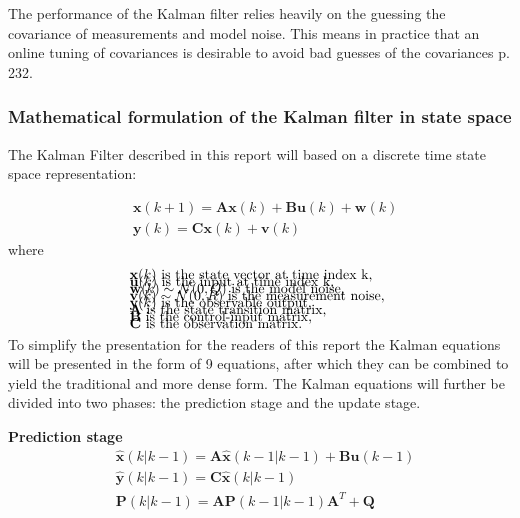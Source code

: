 The performance of the Kalman filter relies heavily on the guessing the covariance of measurements and model noise. This means in practice that an online tuning of covariances is desirable to avoid bad guesses of the covariances \cite{Doraiswami2014} p. 232.

\subsubsection{Mathematical formulation of the Kalman filter in state space}
The Kalman Filter described in this report will based on a discrete time state space representation: 

\begin{align}
	&\textbf{x}(k+1) = \textbf{A}\textbf{x}(k) + \textbf{B}\textbf{u}(k) + \textbf{w}(k)  \label{eq:KalmanSystemEquations} \\
	&\textbf{y}(k) = \textbf{C}\textbf{x}(k)+\textbf{v}(k) 
\end{align}
where 
\begin{align*}
	&\text{$\textbf{x}(k)$ is the state vector at time index k,					}	\\[-1em]
	&\text{$\textbf{u}(k)$ is the input at time index k, 						}	\\[-1em]
	&\text{$\textbf{w}(k) \sim \mathcal{N}(0, Q)$ is the model noise,			}	\\[-1em]
	&\text{$\textbf{v}(k) \sim \mathcal{N}(0, R)$ is the measurement noise,		}	\\[-1em]
	&\text{$\textbf{y}(k)$ is the observable output, 							}	\\[-1em]
	&\text{\textbf{A} is the state transition matrix,							}	\\[-1em]
	&\text{\textbf{B} is the control-input matrix,								}	\\[-1em]
	&\text{\textbf{C} is the observation matrix. 								}	\\[-1em]
\end{align*}

To simplify the presentation for the readers of this report the Kalman equations will be presented in the form of 9 equations, after which they can be combined to yield the traditional and more dense form.
The Kalman equations will further be divided into two phases: the prediction stage and the update stage. 

\textbf{Prediction stage}
\begin{align}
	&\hat{\textbf{x}}	(k|k-1) = \textbf{A} 	\hat{\textbf{x}}(k-1|k-1) + \textbf{B}\textbf{u}(k-1)  				\label{eq:Kalman_pred_state} 	\\
	&\hat{\textbf{y}}	(k|k-1) = \textbf{C}	\hat{\textbf{x}}(k|k-1)										\label{eq:Kalman_pred_output} 	\\
	&\textbf{P}			(k|k-1) = \textbf{A}	\textbf{P}(k-1|k-1)\textbf{A}^T+\textbf{Q} 								\label{eq:Kalman_pred_cov} 		
\end{align}

